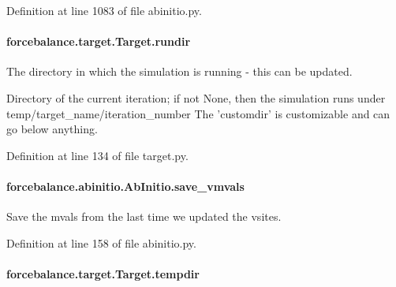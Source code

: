Definition at line 1083 of file abinitio.\-py.

\hypertarget{classforcebalance_1_1target_1_1Target_a6872de5b2d4273b82336ea5b0da29c9e}{
\paragraph[{rundir}]{\setlength{\rightskip}{0pt plus 5cm}forcebalance.\-target.\-Target.\-rundir\hspace{0.3cm}{\ttfamily [inherited]}}}\label{classforcebalance_1_1target_1_1Target_a6872de5b2d4273b82336ea5b0da29c9e}


The directory in which the simulation is running -\/ this can be updated. 

Directory of the current iteration; if not None, then the simulation runs under temp/target\-\_\-name/iteration\-\_\-number The 'customdir' is customizable and can go below anything.

Definition at line 134 of file target.\-py.

\hypertarget{classforcebalance_1_1abinitio_1_1AbInitio_a22037bf43728fa45f387390005e0b131}{
\paragraph[{save\-\_\-vmvals}]{\setlength{\rightskip}{0pt plus 5cm}forcebalance.\-abinitio.\-Ab\-Initio.\-save\-\_\-vmvals\hspace{0.3cm}{\ttfamily [inherited]}}}\label{classforcebalance_1_1abinitio_1_1AbInitio_a22037bf43728fa45f387390005e0b131}


Save the mvals from the last time we updated the vsites. 



Definition at line 158 of file abinitio.\-py.

\hypertarget{classforcebalance_1_1target_1_1Target_aa1f01b5b78db253b5b66384ed11ed193}{
\paragraph[{tempdir}]{\setlength{\rightskip}{0pt plus 5cm}forcebalance.\-target.\-Target.\-tempdir\hspace{0.3cm}{\ttfamily [inherited]}}}\label{classforcebalance_1_1target_1_1Target_aa1f01b5b78db253b5b66384ed11ed193}


